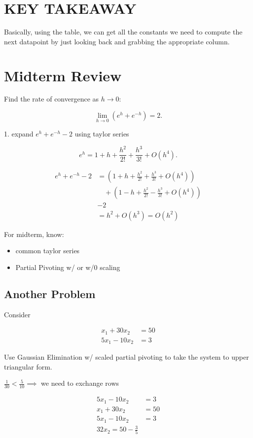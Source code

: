 \section{KEY TAKEAWAY}

Basically, using the table, we can get all the constants we need to compute the
next datapoint by just looking back and grabbing the appropriate column.

\section{Midterm Review}

Find the rate of convergence as $h\to 0$:

\[
  \lim_{h \to 0} (e^h + e^{-h}) = 2
.\]

1. expand $e^h + e^{-h} - 2$ using taylor series

\[
  e^h = 1+h + \frac{h^2}{2!} + \frac{h^3}{3!} + O(h^4)
.\]


\begin{align*}
  e^h + e^{-h} -2 &= \left(1+h + \frac{h^2}{2!} + \frac{h^3}{3!} + O(h^4) \right ) \\
                  &\quad + \left ( 1-h+\frac{h^2}{2!}-\frac{h^3}{3!}+O(h^4) \right ) \\
                  &-2 \\
                  &= h^2 + O(h^3) = O(h^2)
\end{align*}

For midterm, know:
\begin{itemize}
  \item common taylor series 
  \item Partial Pivoting w/ or w/0 scaling
\end{itemize}

\subsection{Another Problem}

Consider

\begin{align*}
  x_1 + 30x_2 &= 50 \\
  5x_1 - 10x_2 &=  3
\end{align*}

Use Gaussian Elimination w/ scaled partial pivoting to take the system to upper
triangular form.

$\displaystyle \frac{1}{30} < \frac{5}{10} \implies$ we need to exchange rows

\begin{align*}
  5x_1 - 10x_2 &=  3 \\
   x_1 + 30x_2 &= 50 \\
  \hline
  5x_1 - 10x_2 &=  3 \\
  32x_2 = 50 - \frac{3}{5}
\end{align*}

